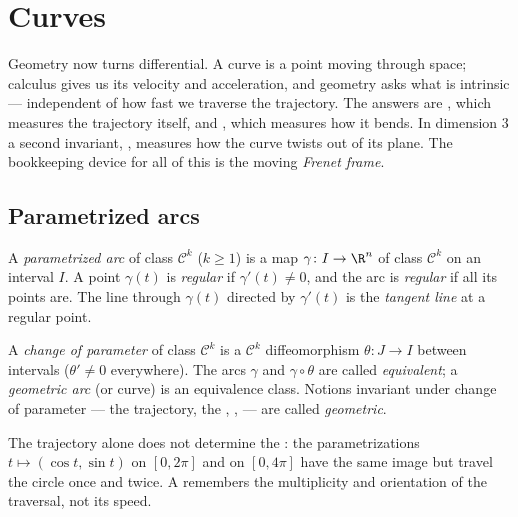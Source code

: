 \chapter{Curves}\label{ch:b2:curves}

Geometry now turns differential. A curve is a point moving through
space; calculus gives us its velocity and acceleration, and geometry
asks what is intrinsic --- independent of how fast we traverse the
trajectory. The answers are \emph{}, which measures the
trajectory itself, and \emph{}, which measures how it
bends. In dimension $3$ a second invariant, \emph{},
measures how the curve twists out of its plane. The bookkeeping
device for all of this is the moving \emph{Frenet frame}.

\section{Parametrized arcs}

\begin{definition}\label{def:b2:curves:arc}
A \emph{parametrized arc} of class
$\mathcal{C}^k$ ($k \geq 1$) is
a map $\gamma \colon I \to \R^n$ of class $\mathcal{C}^k$ on an
interval $I$. A point $\gamma(t)$ is \emph{regular} if
$\gamma'(t) \neq 0$, and the arc is \emph{regular} if all its
points are. The line through $\gamma(t)$ directed by $\gamma'(t)$
is the \emph{tangent line} at a regular point.
\end{definition}

\begin{definition}\label{def:b2:curves:reparam}
A \emph{change of parameter} of class
$\mathcal{C}^k$ is a
$\mathcal{C}^k$ diffeomorphism $\theta \colon J \to I$ between
intervals ($\theta' \neq 0$ everywhere). The arcs $\gamma$ and
$\gamma \circ \theta$ are called \emph{equivalent}; a
\emph{geometric arc} (or curve) is an
equivalence class. Notions
invariant under change of parameter --- the trajectory, the , ,  --- are called \emph{geometric}.
\end{definition}

\begin{remark}
The trajectory alone does not determine the : the
parametrizations $t \mapsto (\cos t, \sin t)$ on $[0, 2\pi]$ and on
$[0, 4\pi]$ have the same image but travel the circle once and
twice. A  remembers the multiplicity and orientation
of the traversal, not its speed.
\end{remark}

